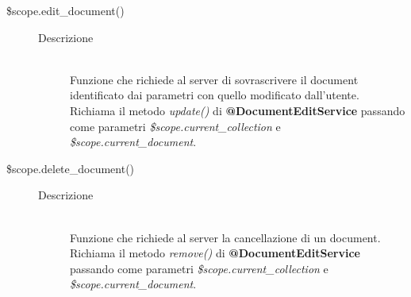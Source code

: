 \begin{description}
\begin{description}
 
   \item[\$scope.edit\_document()] \hfill 
   \begin{description}
  	\item[Descrizione] \hfill \\
	Funzione che richiede al server di sovrascrivere il document identificato dai parametri con quello modificato dall'utente. Richiama il metodo \textit{update()} di \textbf{@DocumentEditService} passando come parametri \textit{\$scope.current\_collection} e \textit{\$scope.current\_document}.
  \end{description}
  
  
  \item[\$scope.delete\_document()] \hfill 
   \begin{description}
  	\item[Descrizione] \hfill \\
    Funzione che richiede al server la cancellazione di un document. Richiama il metodo \textit{remove()} di \textbf{@DocumentEditService} passando come parametri \textit{\$scope.current\_collection} e \textit{\$scope.current\_document}.
   \end{description}
 \end{description}
\end{description}

